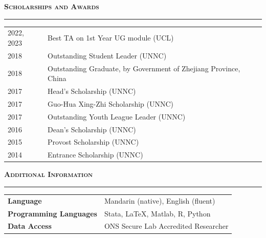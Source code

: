 \documentclass[11pt]{article}
\begin{document}
\noindent\large{\textbf{\textsc{Scholarships and Awards}}}
\vspace{0.2em}
\hrule 
\normalsize
\noindent \begin{tabular}{ p{2cm} p{13.6cm}}
2022, 2023      & Best TA on 1st Year UG module (UCL) \\
2018            & Outstanding Student Leader (UNNC) \\
2018            & Outstanding Graduate, by Government of Zhejiang Province, China \\
2017            & Head's Scholarship (UNNC)\\
2017            & Guo-Hua Xing-Zhi Scholarship (UNNC) \\
2017            & Outstanding Youth League Leader (UNNC) \\
2016            & Dean's Scholarship (UNNC) \\
2015            & Provost Scholarship (UNNC) \\
2014            & Entrance Scholarship (UNNC) \\
\end{tabular}
\vspace{0.6em}

\noindent\large{\textbf{\textsc{Additional Information}}}
\vspace{0.2em}
\hrule
\normalsize
\noindent \begin{tabular}{ p{6cm} p{10.6cm}}
\textbf{Language}       & Mandarin (native), English (fluent) \\
\textbf{Programming Languages}      & Stata, \LaTeX, Matlab, R, Python\\
\textbf{Data Access}      & ONS Secure Lab Accredited Researcher\\
\end{tabular}

\end{document}

